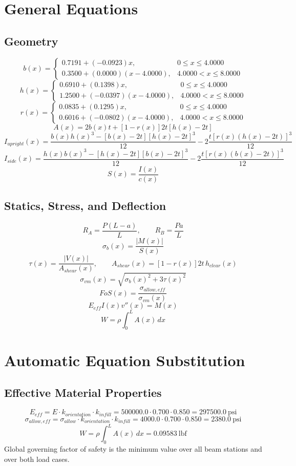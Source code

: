 \documentclass[11pt]{article}
\begin{document}
\section*{General Equations}
\subsection*{Geometry}
\[
b(x)=\begin{cases}0.7191 + (-0.0923)x, & 0 \le x \le 4.0000\\0.3500 + (0.0000)(x-4.0000), & 4.0000 < x \le 8.0000\end{cases}
\]
\[
h(x)=\begin{cases}0.6910 + (0.1398)x, & 0 \le x \le 4.0000\\1.2500 + (-0.0397)(x-4.0000), & 4.0000 < x \le 8.0000\end{cases}
\]
\[
r(x)=\begin{cases}0.0835 + (0.1295)x, & 0 \le x \le 4.0000\\0.6016 + (-0.0802)(x-4.0000), & 4.0000 < x \le 8.0000\end{cases}
\]
\[
A(x)=2b(x)t+[1-r(x)]2t[h(x)-2t]
\]
\[
I_{upright}(x)=\frac{b(x)h(x)^3-[b(x)-2t][h(x)-2t]^3}{12}-2\frac{t[r(x)(h(x)-2t)]^3}{12}
\]
\[
I_{side}(x)=\frac{h(x)b(x)^3-[h(x)-2t][b(x)-2t]^3}{12}-2\frac{t[r(x)(b(x)-2t)]^3}{12}
\]
\[
S(x)=\frac{I(x)}{c(x)}
\]

\subsection*{Statics, Stress, and Deflection}
\[
R_A=\frac{P(L-a)}{L}, \qquad R_B=\frac{Pa}{L}
\]
\[
\sigma_b(x)=\frac{|M(x)|}{S(x)}
\]
\[
\tau(x)=\frac{|V(x)|}{A_{shear}(x)}, \qquad A_{shear}(x)=[1-r(x)]2t\,h_{clear}(x)
\]
\[
\sigma_{vm}(x)=\sqrt{\sigma_b(x)^2+3\tau(x)^2}
\]
\[
FoS(x)=\frac{\sigma_{allow,eff}}{\sigma_{vm}(x)}
\]
\[
E_{eff}I(x)v''(x)=M(x)
\]
\[
W=\rho\int_0^L A(x)\,dx
\]

\section*{Automatic Equation Substitution}
\subsection*{Effective Material Properties}
\[E_{eff} = E \cdot k_{orientation} \cdot k_{infill} = 500000.0 \cdot 0.700 \cdot 0.850 = 297500.0\ \mathrm{psi}\]
\[\sigma_{allow,eff} = \sigma_{allow} \cdot k_{orientation} \cdot k_{infill} = 4000.0 \cdot 0.700 \cdot 0.850 = 2380.0\ \mathrm{psi}\]
\[W = \rho \int_0^L A(x)\,dx = 0.09583\ \mathrm{lbf}\]
Global governing factor of safety is the minimum value over all beam stations and over both load cases.
\end{document}
